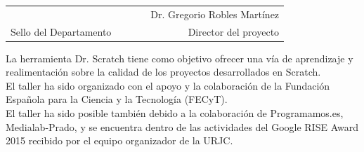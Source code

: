 \documentclass[12pt]{article}
\begin{document}
\begin{center}
\begin{table}[h]
\footnotesize
\begin{center}
\begin{tabular}{lp{2cm}cp{2cm}r}
\Large{ } & & 
\Large{  } & & 
\Large{Dr. Gregorio Robles Martínez} \\
Sello del Departamento & &
 & & 
Director del proyecto \\ 
\end{tabular}
\end{center}
\end{table}

\vspace{-0.5cm}

\scriptsize 
{La herramienta Dr. Scratch tiene como objetivo ofrecer una vía de aprendizaje y realimentación sobre la calidad de los proyectos desarrollados en Scratch. \\ 
El taller ha sido organizado con el apoyo y la colaboración de la Fundación Española para la Ciencia y la Tecnología (FECyT). \\ 
El taller ha sido posible también debido a la colaboración de Programamos.es, Medialab-Prado, y se encuentra dentro de las actividades del Google RISE Award 2015 recibido por el equipo organizador de la URJC.}

\end{center}
\end{document}
